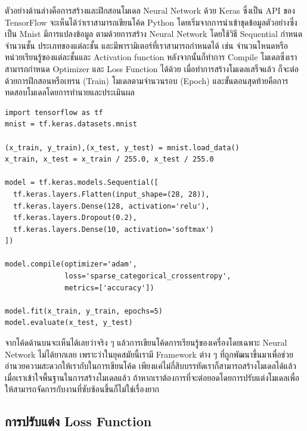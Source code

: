 ตัวอย่างด้านล่างคือการสร้างและฝึกสอนโมเดล Neural Network ด้วย Keras ซึ่งเป็น API ของ TensorFlow จะเห็นได้ว่าเราสามารถเขียนโค้ด 
Python โดยเริ่มจากการนำเข้าชุดข้อมูลตัวอย่างซึ่งเป็น Mnist มีการแปลงข้อมูล ตามด้วยการสร้าง Neural Network โดยใช้วิธี Sequential 
กำหนดจำนวนชั้น ประเภทของแต่ละชั้น และมีพารามิเตอร์ที่เราสามารถกำหนดได้ เช่น จำนวนโหนดหรือหน่วยเรียนรู้ของแต่ละชั้นและ Activation 
function หลังจากนั้นก็ทำการ Compile โมเดลซึ่งเราสามารถกำหนด Optimizer และ Loss Function ได้ด้วย เมื่อทำการสร้างโมเดลเสร็จแล้ว 
ก็จะต่อด้วยการฝึกสอนหรือเทรน (Train) โมเดลตามจำนวนรอบ (Epoch) และขั้นตอนสุดท้ายคือการทดสอบโมเดลโดยการทำนายและประเมินผล

\begin{lstlisting}[style=MyPython]
import tensorflow as tf
mnist = tf.keras.datasets.mnist

(x_train, y_train),(x_test, y_test) = mnist.load_data()
x_train, x_test = x_train / 255.0, x_test / 255.0

model = tf.keras.models.Sequential([
  tf.keras.layers.Flatten(input_shape=(28, 28)),
  tf.keras.layers.Dense(128, activation='relu'),
  tf.keras.layers.Dropout(0.2),
  tf.keras.layers.Dense(10, activation='softmax')
])

model.compile(optimizer='adam',
              loss='sparse_categorical_crossentropy',
              metrics=['accuracy'])

model.fit(x_train, y_train, epochs=5)
model.evaluate(x_test, y_test)
\end{lstlisting}

จากโค้ดด้านบนจะเห็นได้เลยว่าจริง ๆ แล้วการเขียนโค้ดการเรียนรู้ของเครื่องโดยเฉพาะ Neural Network ไม่ได้ยากเลย เพราะว่าในยุคสมัยนี้เรามี 
Framework ต่าง ๆ ที่ถูกพัฒนาขึ้นมาเพื่อช่วยอำนวยความสะดวกให้เรากับในการเขียนโค้ด เพียงแค่ไม่กี่สิบบรรทัดเราก็สามารถสร้างโมเดลได้แล้ว
เมื่อเราเข้าใจพื้นฐานในการสร้างโมเดลแล้ว ถ้าหากเราต้องการที่จะต่อยอดโดยการปรับแต่งโมเดลเพื่อให้สามารถจัดการกับงานที่ซับซ้อนขึ้นก็ไม่ใช่เรื่องยาก

\subsection{การปรับแต่ง Loss Function}


